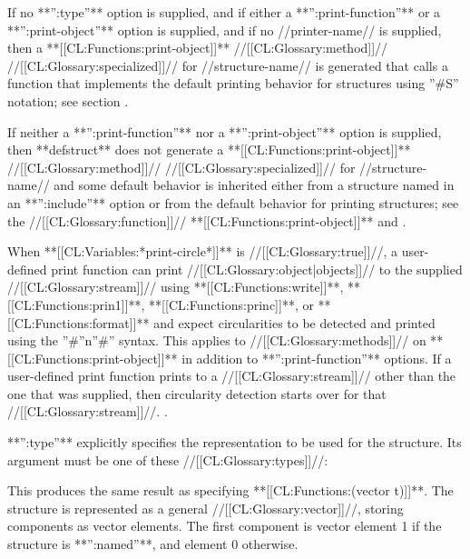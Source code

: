 If no **'':type''** option is supplied, and if either a **'':print-function''** or a **'':print-object''** option is supplied, and if no //printer-name// is supplied, then a **[[CL:Functions:print-object]]** //[[CL:Glossary:method]]// //[[CL:Glossary:specialized]]// for //structure-name// is generated that calls a function that implements the default printing behavior for structures using ''#S'' notation; see section {\secref\PrintingStructures}.

If neither a **'':print-function''** nor a **'':print-object''** option is supplied, then **defstruct** does not generate a **[[CL:Functions:print-object]]** //[[CL:Glossary:method]]// //[[CL:Glossary:specialized]]// for //structure-name// and some default behavior is inherited either from a structure named in an **'':include''** option or from the default behavior for printing structures; see the //[[CL:Glossary:function]]// **[[CL:Functions:print-object]]** and \secref\PrintingStructures.

When **[[CL:Variables:*print-circle*]]** is //[[CL:Glossary:true]]//, a user-defined print function can print //[[CL:Glossary:object|objects]]// to the supplied //[[CL:Glossary:stream]]// using **[[CL:Functions:write]]**, **[[CL:Functions:prin1]]**, **[[CL:Functions:princ]]**, or **[[CL:Functions:format]]** and expect circularities to be detected and printed using the ''#''n''#'' syntax. This applies to //[[CL:Glossary:methods]]// on **[[CL:Functions:print-object]]** in addition to **'':print-function''** options. If a user-defined print function prints to a //[[CL:Glossary:stream]]// other than the one that was supplied, then circularity detection starts over for that //[[CL:Glossary:stream]]//. .




**'':type''** explicitly specifies the representation to be used for the structure. Its argument must be one of these //[[CL:Glossary:types]]//:

\beginlist


This produces the same result as specifying **[[CL:Functions:(vector t)]]**. The structure is represented as a general //[[CL:Glossary:vector]]//, storing components as vector elements. The first component is vector element 1 if the structure is **'':named''**, and element 0 otherwise.


